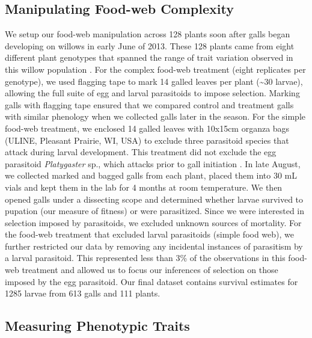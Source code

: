 \documentclass[11pt,]{article}
\begin{document}
\subsection{Manipulating Food-web
Complexity}\label{manipulating-food-web-complexity}

We setup our food-web manipulation across 128 plants soon after galls
began developing on willows in early June of 2013. These 128 plants came
from eight different plant genotypes that spanned the range of trait
variation observed in this willow population \citep{Barbour2015}. For
the complex food-web treatment (eight replicates per genotype), we used
flagging tape to mark 14 galled leaves per plant (\textasciitilde{}30
larvae), allowing the full suite of egg and larval parasitoids to impose
selection. Marking galls with flagging tape ensured that we compared
control and treatment galls with similar phenology when we collected
galls later in the season. For the simple food-web treatment, we
enclosed 14 galled leaves with 10x15cm organza bags (ULINE, Pleasant
Prairie, WI, USA) to exclude three parasitoid species that attack during
larval development. This treatment did not exclude the egg parasitoid
\emph{Platygaster} sp., which attacks prior to gall initiation
\citep[larva initiate gall development in Cecidomyiid
midges:][]{Gagne1989}. In late August, we collected marked and bagged
galls from each plant, placed them into 30 mL vials and kept them in the
lab for 4 months at room temperature. We then opened galls under a
dissecting scope and determined whether larvae survived to pupation (our
measure of fitness) or were parasitized. Since we were interested in
selection imposed by parasitoids, we excluded unknown sources of
mortality. For the food-web treatment that excluded larval parasitoids
(simple food web), we further restricted our data by removing any
incidental instances of parasitism by a larval parasitoid. This
represented less than 3\% of the observations in this food-web treatment
and allowed us to focus our inferences of selection on those imposed by
the egg parasitoid. Our final dataset contains survival estimates for
1285 larvae from 613 galls and 111 plants.

\subsection{Measuring Phenotypic
Traits}\label{measuring-phenotypic-traits}
\end{document}
